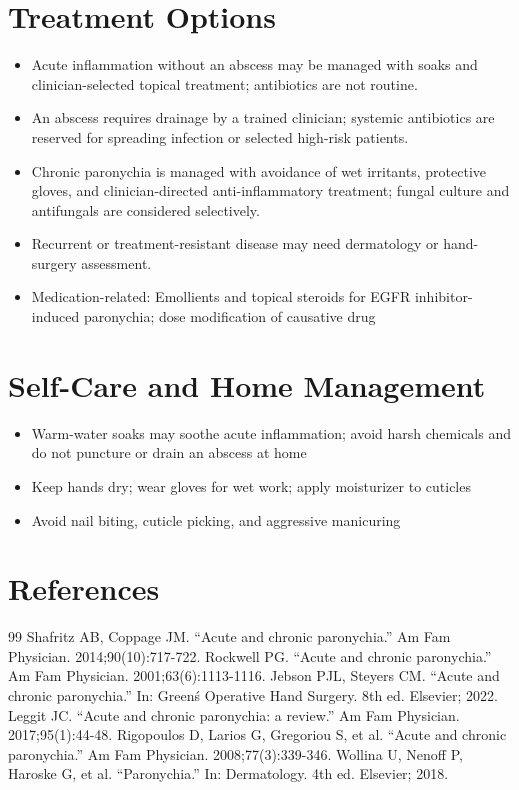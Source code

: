 \section*{Treatment Options}
\begin{itemize}
  \item Acute inflammation without an abscess may be managed with soaks and clinician-selected topical treatment; antibiotics are not routine.
  \item An abscess requires drainage by a trained clinician; systemic antibiotics are reserved for spreading infection or selected high-risk patients.
  \item Chronic paronychia is managed with avoidance of wet irritants, protective gloves, and clinician-directed anti-inflammatory treatment; fungal culture and antifungals are considered selectively.
  \item Recurrent or treatment-resistant disease may need dermatology or hand-surgery assessment.
  \item Medication-related: Emollients and topical steroids for EGFR inhibitor-induced paronychia; dose modification of causative drug
\end{itemize}

\section*{Self-Care and Home Management}
\begin{itemize}
  \item Warm-water soaks may soothe acute inflammation; avoid harsh chemicals and do not puncture or drain an abscess at home
  \item Keep hands dry; wear gloves for wet work; apply moisturizer to cuticles
  \item Avoid nail biting, cuticle picking, and aggressive manicuring
\end{itemize}

\section*{References}
\begin{thebibliography}{99}
 Shafritz AB, Coppage JM. ``Acute and chronic paronychia.'' Am Fam Physician. 2014;90(10):717-722.
 Rockwell PG. ``Acute and chronic paronychia.'' Am Fam Physician. 2001;63(6):1113-1116.
 Jebson PJL, Steyers CM. ``Acute and chronic paronychia.'' In: Green\'s Operative Hand Surgery. 8th ed. Elsevier; 2022.
 Leggit JC. ``Acute and chronic paronychia: a review.'' Am Fam Physician. 2017;95(1):44-48.
 Rigopoulos D, Larios G, Gregoriou S, et al. ``Acute and chronic paronychia.'' Am Fam Physician. 2008;77(3):339-346.
 Wollina U, Nenoff P, Haroske G, et al. ``Paronychia.'' In: Dermatology. 4th ed. Elsevier; 2018.
\end{thebibliography}

